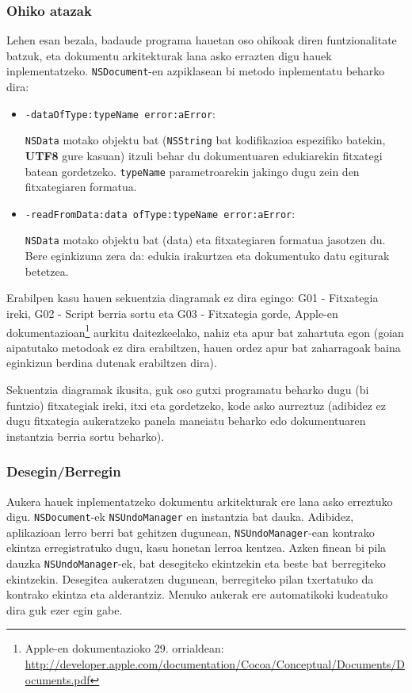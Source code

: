 \subsubsection{Ohiko atazak}
Lehen esan bezala, badaude programa hauetan oso ohikoak diren funtzionalitate batzuk, eta dokumentu arkitekturak lana asko errazten digu hauek inplementatzeko. \texttt{NSDocument}-en azpiklasean bi metodo inplementatu beharko dira:
\begin{itemize}
\item \texttt{-dataOfType:typeName error:aError}:

\texttt{NSData} motako objektu bat (\texttt{NSString} bat kodifikazioa espezifiko batekin, \textbf{UTF8} gure kasuan) itzuli behar du dokumentuaren edukiarekin fitxategi batean gordetzeko. \texttt{typeName} parametroarekin jakingo dugu zein den fitxategiaren formatua.

\item \texttt{-readFromData:data ofType:typeName error:aError}:

\texttt{NSData} motako objektu bat (data) eta fitxategiaren formatua jasotzen du. Bere eginkizuna zera da: edukia irakurtzea eta dokumentuko datu egiturak betetzea.
\end{itemize}

Erabilpen kasu hauen sekuentzia diagramak ez dira egingo: G01 - Fitxategia ireki, G02 - Script berria sortu eta G03 - Fitxategia gorde, Apple-en dokumentazioan\footnote{Apple-en dokumentazioko\cite{ap:dba} 29. orrialdean: \url{http://developer.apple.com/documentation/Cocoa/Conceptual/Documents/Documents.pdf}} aurkitu daitezkeelako, nahiz eta apur bat zahartuta egon (goian aipatutako metodoak ez dira erabiltzen, hauen ordez apur bat zaharragoak baina eginkizun berdina dutenak erabiltzen dira).

Sekuentzia diagramak ikusita, guk oso gutxi programatu beharko dugu (bi funtzio) fitxategiak ireki, itxi eta gordetzeko, kode asko aurreztuz (adibidez ez dugu fitxategia aukeratzeko panela maneiatu beharko edo dokumentuaren instantzia berria sortu beharko).

\subsubsection{Desegin/Berregin}
Aukera hauek inplementatzeko dokumentu arkitekturak ere lana asko erreztuko digu. \texttt{NSDocument}-ek \texttt{NSUndoManager} en instantzia bat dauka. Adibidez, aplikazioan lerro berri bat gehitzen dugunean, \texttt{NSUndoManager}-ean kontrako ekintza erregistratuko dugu, kasu honetan lerroa kentzea. Azken finean bi pila dauzka \texttt{NSUndoManager}-ek, bat desegiteko ekintzekin eta beste bat berregiteko ekintzekin. Desegitea aukeratzen dugunean, berregiteko pilan txertatuko da kontrako ekintza eta alderantziz. Menuko aukerak ere automatikoki kudeatuko dira guk ezer egin gabe.

